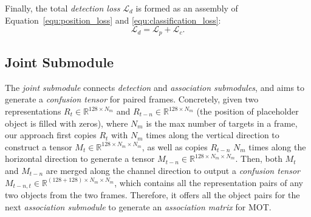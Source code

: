 \documentclass[acmsmall]{acmart}
\begin{document}
Finally, the total \emph{detection loss} $\mathcal{L}_{d}$ is formed as an assembly of Equation~\ref{equ:position_loss} and \ref{equ:classification_loss}:
\begin{equation}
\mathcal{L}_{d} = \mathcal{L}_{p} + \mathcal{L}_{c}.
\end{equation}


\subsection{Joint Submodule}


{
The \emph{joint submodule} connects \emph{detection} and \emph{association submodules}, and aims to generate a \emph{confusion tensor} for paired frames.
Concretely, given}
two representations $R_t \in \mathbb{R}^{128 \times N_m}$ and $R_{t-n} \in \mathbb{R}^{128 \times N_m}$ (the position of placeholder object is filled with zeros), where $N_m$ is the max number of targets in a frame, 
{
our approach first copies $R_t$ with $N_m$ times
} along the vertical direction to construct a tensor $M_t \in \mathbb{R}^{128 \times N_m \times N_m}$, as well as copies $R_{t-n}$ $N_m$ times along the horizontal direction to generate a tensor $M_{t-n} \in \mathbb{R}^{128 \times N_m \times N_m}$.
{
Then, both $M_t$ and $M_{t-n}$ 
}
are merged along the channel direction to output a \emph{confusion tensor} $M_{t-n,t} \in \mathbb{R}^{(128 + 128) \times N_m \times N_m}$, 
{
which contains all the representation pairs of any two objects from the two frames.
Therefore, it offers all the object pairs for the next \emph{association submodule} to generate an \emph{association matrix} for MOT.
}
\end{document}
